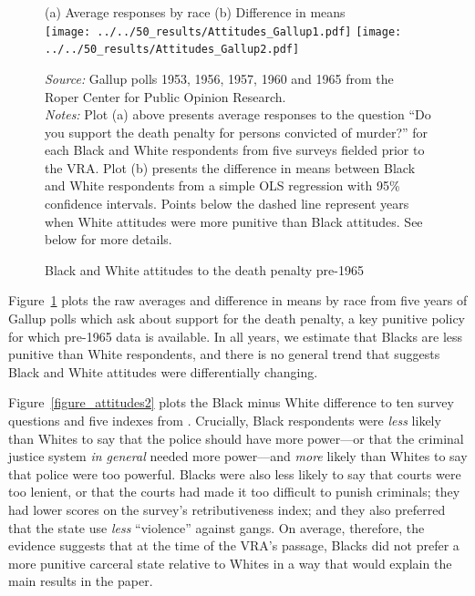 \documentclass[12pt]{article}
\begin{document}
\begin{figure}[h!]
 \begin{center}
 \caption{Black and White attitudes to the death penalty pre-1965}
 \smallskip \smallskip
 \small
 			(a) Average responses by race  \hspace*{1.2in} (b) Difference in means \\

			\texttt{[image: ../../50\_results/Attitudes\_Gallup1.pdf]}
			\texttt{[image: ../../50\_results/Attitudes\_Gallup2.pdf]} \\
			\label{figure_attitudes1}
			 \end{center}
{\scriptsize{\emph{Source:} Gallup polls 1953, 1956, 1957, 1960 and 1965 from the Roper Center for Public Opinion Research.  }} \\
{\scriptsize{\emph{Notes:} Plot (a) above presents average responses to the question ``Do you support the death penalty for persons convicted of murder?'' for each Black and White respondents from five surveys fielded prior to the VRA.  Plot (b) presents the difference in means between Black and White respondents from a simple OLS regression with 95\% confidence intervals.  Points below the dashed line represent years when White attitudes were more punitive than Black attitudes. See below for more details. \singlespacing }}
			\end{figure} \normalsize




Figure~\ref{figure_attitudes1} plots the raw averages and difference in means by race from five years of Gallup polls which ask about support for the death penalty, a key punitive policy for which pre-1965 data is available.  In all years, we estimate that Blacks are less punitive than White respondents, and there is no general trend that suggests Black and White attitudes were differentially changing.

Figure~\ref{figure_attitudes2} plots the Black minus White difference to ten survey questions and five indexes from .  Crucially, Black respondents were \emph{less} likely than Whites to say that the police should have more power---or that the criminal justice system \emph{in general} needed more power---and \emph{more} likely than Whites to say that police were too powerful.  Blacks were also less likely to say that courts were too lenient, or that the courts had made it too difficult to punish criminals; they had lower scores on the survey's retributiveness index; and they also preferred that the state use \emph{less} ``violence'' against gangs.  On average, therefore, the evidence suggests that at the time of the VRA's passage, Blacks did not prefer a more punitive carceral state relative to Whites in a way that would explain the main results in the paper.
\end{document}
